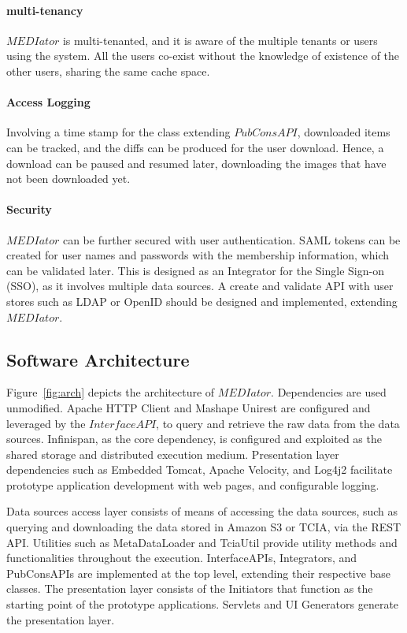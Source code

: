 \documentclass[letterpaper, 10 pt, conference]{ieeeconf}  %
\begin{document}
\paragraph*{\textbf{multi-tenancy}}
$MEDIator$ is multi-tenanted, and it is aware of the multiple tenants or users using the system. All the users co-exist without the knowledge of existence of the other users, sharing the same cache space. 

\paragraph*{\textbf{Access Logging}}
Involving a time stamp for the class extending $PubConsAPI$, downloaded items can be tracked, and the diffs can be produced for the user download. Hence, a download can be paused and resumed later, downloading the images that have not been downloaded yet.

\paragraph*{\textbf{Security}}
$MEDIator$ can be further secured with user authentication. SAML tokens can be created for user names and passwords with the membership information, which can be validated later. This is designed as an Integrator for the Single Sign-on (SSO), as it involves multiple data sources. A create and validate API with user stores such as LDAP or OpenID should be designed and implemented, extending $MEDIator$.

\subsection{Software Architecture}
Figure~\ref{fig:arch} depicts the architecture of $MEDIator$. Dependencies are used unmodified. Apache HTTP Client and Mashape Unirest are configured and leveraged by the $InterfaceAPI$, to query and retrieve the raw data from the data sources. Infinispan, as the core dependency, is configured and exploited as the shared storage and distributed execution medium. Presentation layer dependencies such as Embedded Tomcat, Apache Velocity, and Log4j2 facilitate prototype application development with web pages, and configurable logging.


Data sources access layer consists of means of accessing the data sources, such as querying and downloading the data stored in Amazon S3 or TCIA, via the REST API. Utilities such as MetaDataLoader and TciaUtil provide utility methods and functionalities throughout the execution. InterfaceAPIs, Integrators, and PubConsAPIs are implemented at the top level, extending their respective base classes. The presentation layer consists of the Initiators that function as the starting point of the prototype applications. Servlets and UI Generators generate the presentation layer. 
\end{document}
